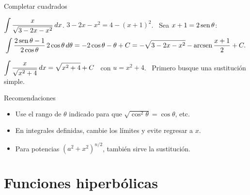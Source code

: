 \documentclass[10pt,aspectratio=169]{beamer}
\begin{document}
\begin{frame}{Completar cuadrados}
  \begin{ejemplo}[7]
    $\displaystyle\int\frac{x}{\sqrt{3-2x-x^2}}\,dx$. \quad $3-2x-x^2=4-(x+1)^2$. \ Sea $x+1=2\operatorname{sen}\theta$:
    \[ \int\frac{2\operatorname{sen}\theta-1}{2\cos\theta}\,2\cos\theta\,d\theta=-2\cos\theta-\theta+C
       =-\sqrt{3-2x-x^2}-\operatorname{arcsen}\frac{x+1}{2}+C. \]
  \end{ejemplo}
  \begin{ejemplo}
    $\displaystyle\int\frac{x}{\sqrt{x^2+4}}\,dx=\sqrt{x^2+4}+C$ \ con $u=x^2+4$. \ Primero busque una sustitución simple.
  \end{ejemplo}
  \begin{block}{Recomendaciones}
    \begin{itemize}
      \item Use el rango de $\theta$ indicado para que $\sqrt{\cos^2\theta}=\cos\theta$, etc.
      \item En integrales definidas, cambie los límites y evite regresar a $x$.
      \item Para potencias $(a^2+x^2)^{n/2}$, también sirve la sustitución.
    \end{itemize}
  \end{block}
\end{frame}

\section{Funciones hiperbólicas}
\end{document}
